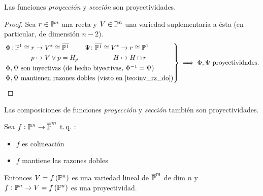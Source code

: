 \begin{col}
	Las funciones \textit{proyección} y \textit{sección} son proyectividades.
\end{col}
\begin{proof}
	Sea $r \in \mathbb{P}^n$ una recta y $V \in \mathbb{P}^n$ una variedad suplementaria a ésta
	(en particular, de dimensión $n-2$).
	\[
		\begin{rcases}
			\begin{aligned}
			\Phi \colon \mathbb{P}^1 \cong r &\to V^\ast \cong \overline{\mathbb{P}^1} \\
			p &\mapsto V \vee p = H_p
			\end{aligned}
			\quad
			\begin{aligned}
			\Psi \colon \overline{\mathbb{P}^1} \cong V^* &\to r \cong \mathbb{P}^1 \\ H &\mapsto H \cap r
			\end{aligned} \\
			\Phi, \Psi \text{ son inyectivas (de hecho biyectivas, } \Phi^{-1} = \Psi
			\text{)}\\
			\Phi, \Psi \text{ mantienen razones dobles (visto en \ref{teo:inv_rz_do})}
	\end{rcases}
	\implies
	\Phi, \Psi \text{ proyectividades.}
 \]
\end{proof}
\begin{obs}
	Las composiciones de funciones \textit{proyección} y \textit{sección} también son proyectividades.
\end{obs}
\begin{prop} \label{prop:demo_teo2}
	Sea $f : \mathbb{P}^n \to \overline{\mathbb{P}}^m \operatorname{\;t.q.\;}$:
	\begin{itemize}
		\item $f$ es colineación
		\item $f$ mantiene las razones dobles
	\end{itemize}
	Entonces $V = f \left( \mathbb{P}^n \right)$ es una variedad lineal de $\overline{\mathbb{P}}^m$ de dim $n$ y $f : \mathbb{P}^n \to V = f \left( \mathbb{P}^n \right)$ es una proyectividad.
\end{prop}
